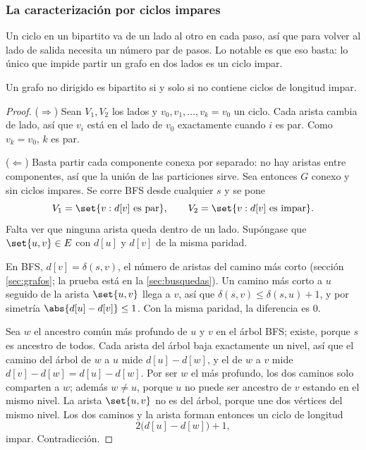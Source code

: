 \documentclass[11pt,letterpaper]{article}
\begin{document}
\subsubsection*{La caracterización por ciclos impares}

Un ciclo en un bipartito va de un lado al otro en cada paso, así que
para volver al lado de salida necesita un número par de pasos. Lo
notable es que eso basta: lo único que impide partir un grafo en dos
lados es un ciclo impar.

\begin{teorema}
  \label{teo:bipartito-ciclos}
  Un grafo no dirigido es bipartito si y solo si no contiene ciclos
  de longitud impar.
\end{teorema}

\begin{proof}
  ($\Rightarrow$) Sean $V_1, V_2$ los lados y
  $v_0, v_1, \dots, v_k = v_0$ un ciclo. Cada arista cambia de lado,
  así que $v_i$ está en el lado de $v_0$ exactamente cuando $i$ es
  par. Como $v_k = v_0$, $k$ es par.

  ($\Leftarrow$) Basta partir cada componente conexa por separado: no
  hay aristas entre componentes, así que la unión de las particiones
  sirve. Sea entonces $G$ conexo y sin ciclos impares. Se corre BFS
  desde cualquier $s$ y se pone
  \[
    V_1 = \set{v : d[v] \text{ es par}} , \qquad
    V_2 = \set{v : d[v] \text{ es impar}} .
  \]
  Falta ver que ninguna arista queda dentro de un lado. Supóngase que
  $\set{u, v} \in E$ con $d[u]$ y $d[v]$ de la misma paridad.

   En BFS, $d[v] = \delta(s, v)$, el
  número de aristas del camino más corto (sección \ref{sec:grafos};
  la prueba está en la \ref{sec:busquedas}). Un camino más corto a $u$
  seguido de la arista $\set{u, v}$ llega a $v$, así que
  $\delta(s, v) \le \delta(s, u) + 1$, y por simetría
  $\abs{d[u] - d[v]} \le 1$. Con la misma paridad, la diferencia es
  $0$.

   Sea $w$ el ancestro común más profundo de
  $u$ y $v$ en el árbol BFS; existe, porque $s$ es ancestro de todos.
  Cada arista del árbol baja exactamente un nivel, así que el camino
  del árbol de $w$ a $u$ mide $d[u] - d[w]$, y el de $w$ a $v$ mide
  $d[v] - d[w] = d[u] - d[w]$. Por ser $w$ el más profundo, los dos
  caminos solo comparten a $w$; además $w \ne u$, porque $u$ no puede
  ser ancestro de $v$ estando en el mismo nivel. La arista
  $\set{u, v}$ no es del árbol, porque une dos vértices del mismo
  nivel. Los dos caminos y la arista forman entonces un ciclo de
  longitud
  \[
    2\bigl(d[u] - d[w]\bigr) + 1 ,
  \]
  impar. Contradicción.
\end{proof}
\end{document}
